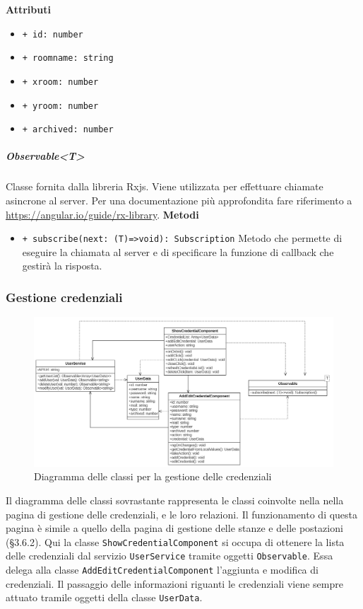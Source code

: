 \textbf{Attributi}
\begin{itemize}
	\item \texttt{+ id: number 	}
	\item \texttt{+ roomname: string 	}
	\item \texttt{+ xroom: number 	}
	\item \texttt{+ yroom: number 	}
	\item \texttt{+ archived: number}
\end{itemize}
\subparagraph{Observable<T>}
Classe fornita dalla libreria Rxjs. Viene utilizzata per effettuare chiamate asincrone al server. Per una documentazione più approfondita fare riferimento a \url{https://angular.io/guide/rx-library}. \newline
\textbf{Metodi}
\begin{itemize}
	\item \texttt{+ subscribe(next: (T)=>void): Subscription} \newline
	Metodo che permette di eseguire la chiamata al server e di specificare la funzione di callback che gestirà la risposta.
\end{itemize}

\subsubsection{Gestione credenziali}
\begin{figure}[H]
	\centering
	\includegraphics[width=18cm]{res/images/webapp-credenziali-diagrammaClassi.png}
	\caption{Diagramma delle classi per la gestione delle credenziali}
	\label{fig:DiagrammaClassiCredenziali}
\end{figure}
Il diagramma delle classi sovrastante rappresenta le classi coinvolte nella nella pagina di gestione delle credenziali, e le loro relazioni. Il funzionamento di questa pagina è simile a quello della pagina di gestione delle stanze e delle postazioni (§3.6.2). Qui la classe \texttt{ShowCredentialComponent} si occupa di ottenere la lista delle credenziali dal servizio \texttt{UserService} tramite oggetti \texttt{Observable}. Essa delega alla classe \texttt{AddEditCredentialComponent} l'aggiunta e modifica di credenziali. Il passaggio delle informazioni riguanti le credenziali viene sempre attuato tramile oggetti della classe \texttt{UserData}.

